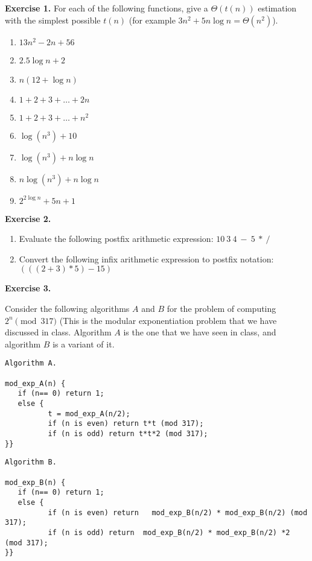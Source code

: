 \documentclass[11pt]{article}
\begin{document}
\textbf{Exercise 1.}
For each of the following functions, give a $\Theta(t(n))$ estimation with the simplest possible $t(n)$ (for example $3n^2 +5 n \log n = \Theta(n^2)$).
\begin{enumerate}
\item $13n^2 - 2n + 56$
\item $2.5 \log n + 2$
\item $n (12 + \log n)$
\item $1+2 + 3 + \ldots + 2n$
\item $1+2 + 3 + \ldots + n^2$
\item $\log (n^3) + 10$
\item $\log(n^3) + n \log n$
\item $n \log(n^3) + n \log n$
\item $2^{2 \log n} + 5n +1$
\end{enumerate}
\bigskip

\textbf{Exercise 2.}  
\begin{enumerate}
\item Evaluate the following postfix arithmetic expression:  $10~3~4~-~5~*~/$
\item Convert the following infix arithmetic expression to postfix notation: $(((2+3)*5)-15)$

\end{enumerate}

\bigskip

\textbf{Exercise 3.}

Consider the following algorithms $A$ and $B$ for the problem of computing $2^n \pmod{ 317}$ (This is the modular exponentiation problem that we  have discussed in class. Algorithm $A$ is the one that we have seen in class, and algorithm $B$ is a variant of it.

\begin{verbatim}
Algorithm A.

mod_exp_A(n) {
   if (n== 0) return 1;
   else {
          t = mod_exp_A(n/2);  
          if (n is even) return t*t (mod 317);
          if (n is odd) return t*t*2 (mod 317);
}}
\end{verbatim}


\begin{verbatim}
Algorithm B.

mod_exp_B(n) {
   if (n== 0) return 1;
   else {
          if (n is even) return   mod_exp_B(n/2) * mod_exp_B(n/2) (mod 317);
          if (n is odd) return  mod_exp_B(n/2) * mod_exp_B(n/2) *2 (mod 317);
}}
\end{verbatim}
\end{document}
